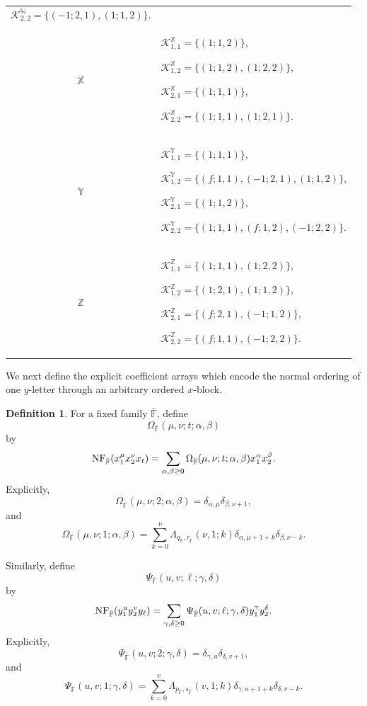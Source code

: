 \documentclass{amsart}
\theoremstyle{definition}
\newtheorem{definition}[theorem]{Definition}
\theoremstyle{remark}
\numberwithin{equation}{section}
\begin{document}
\begin{center}
\begin{longtable}{c|p{}}
$\mathscr{K}_{2,2}^{\mathbb{W}}=\{(-1;2,1),(1;1,2)\}$.
\\

$\mathbb{X}$ &
$\mathscr{K}_{1,1}^{\mathbb{X}}=\{(1;1,2)\}$,

$\mathscr{K}_{1,2}^{\mathbb{X}}=\{(1;1,2),(1;2,2)\}$,

$\mathscr{K}_{2,1}^{\mathbb{X}}=\{(1;1,1)\}$,

$\mathscr{K}_{2,2}^{\mathbb{X}}=\{(1;1,1),(1;2,1)\}$.
\\

$\mathbb{Y}$ &
$\mathscr{K}_{1,1}^{\mathbb{Y}}=\{(1;1,1)\}$,

$\mathscr{K}_{1,2}^{\mathbb{Y}}=\{(f;1,1),(-1;2,1),(1;1,2)\}$,

$\mathscr{K}_{2,1}^{\mathbb{Y}}=\{(1;1,2)\}$,

$\mathscr{K}_{2,2}^{\mathbb{Y}}=\{(1;1,1),(f;1,2),(-1;2,2)\}$.
\\

$\mathbb{Z}$ &
$\mathscr{K}_{1,1}^{\mathbb{Z}}=\{(1;1,1),(1;2,2)\}$,

$\mathscr{K}_{1,2}^{\mathbb{Z}}=\{(1;2,1),(1;1,2)\}$,

$\mathscr{K}_{2,1}^{\mathbb{Z}}=\{(f;2,1),(-1;1,2)\}$,

$\mathscr{K}_{2,2}^{\mathbb{Z}}=\{(f;1,1),(-1;2,2)\}$.
\\

\bottomrule
\end{longtable}
\end{center}

We next define the explicit coefficient arrays which encode the normal ordering of one $y$-letter through an arbitrary ordered $x$-block.

\begin{definition}\label{DefinitionOmegaPsiFamily}
For a fixed family $\bar{\mathbb{F}}$, define
\[
\Omega_{\bar{\mathbb{F}}}(\mu,\nu;t;\alpha,\beta)
\]
by
\[
{\rm NF}_{\bar{\mathbb{F}}}(x_1^\mu x_2^\nu x_t)
=
\sum_{\alpha,\beta\ge0}
\Omega_{\bar{\mathbb{F}}}(\mu,\nu;t;\alpha,\beta)
x_1^\alpha x_2^\beta.
\]
Explicitly,
\[
\Omega_{\bar{\mathbb{F}}}(\mu,\nu;2;\alpha,\beta)
=
\delta_{\alpha,\mu}\delta_{\beta,\nu+1},
\]
and
\[
\Omega_{\bar{\mathbb{F}}}(\mu,\nu;1;\alpha,\beta)
=
\sum_{k=0}^{\nu}
\Lambda_{q_{\bar{\mathbb{F}}},r_{\bar{\mathbb{F}}}}(\nu,1;k)
\delta_{\alpha,\mu+1+k}
\delta_{\beta,\nu-k}.
\]

Similarly, define
\[
\Psi_{\bar{\mathbb{F}}}(u,v;\ell;\gamma,\delta)
\]
by
\[
{\rm NF}_{\bar{\mathbb{F}}}(y_1^uy_2^vy_\ell)
=
\sum_{\gamma,\delta\ge0}
\Psi_{\bar{\mathbb{F}}}(u,v;\ell;\gamma,\delta)
y_1^\gamma y_2^\delta.
\]
Explicitly,
\[
\Psi_{\bar{\mathbb{F}}}(u,v;2;\gamma,\delta)
=
\delta_{\gamma,u}\delta_{\delta,v+1},
\]
and
\[
\Psi_{\bar{\mathbb{F}}}(u,v;1;\gamma,\delta)
=
\sum_{k=0}^{v}
\Lambda_{p_{\bar{\mathbb{F}}},s_{\bar{\mathbb{F}}}}(v,1;k)
\delta_{\gamma,u+1+k}
\delta_{\delta,v-k}.
\]
\end{definition}
\end{document}
